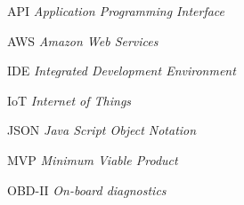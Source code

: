 
\begin{basedescript}{\desclabelstyle{\pushlabel}\desclabelwidth{6em}}
\item[{API}] \textit{Application Programming Interface}
\item[{AWS}] \textit{Amazon Web Services}
\item[{IDE}] \textit{Integrated Development Environment}
\item[{IoT}] \textit{Internet of Things}
\item[{JSON}] \textit{Java Script Object Notation}
\item[{MVP}] \textit{Minimum Viable Product}
\item[{OBD-II}] \textit{On-board diagnostics}

\end{basedescript}